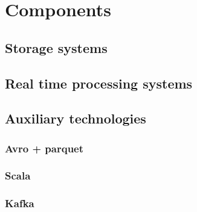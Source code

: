 \chapter{Components}
\label{chap:components}


\section{Storage systems}





\section{Real time processing systems}





\section{Auxiliary technologies}

\subsection{Avro + parquet}

\subsection{Scala}

\subsection{Kafka}



